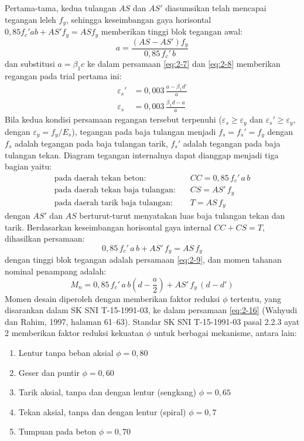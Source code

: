Pertama-tama, kedua tulangan $AS$ dan $AS'$ diasumsikan telah mencapai
tegangan leleh $f_y$, sehingga keseimbangan gaya horisontal
$0{,}85f_c'ab + AS'f_y = AS f_y$ memberikan tinggi blok tegangan awal:
\begin{equation}
a = \frac{(AS-AS')f_y}{0{,}85\,f_c'\,b}
\label{eq:2-9}
\end{equation}
dan substitusi $a=\beta_1 c$ ke dalam persamaan \eqref{eq:2-7} dan
\eqref{eq:2-8} memberikan regangan pada trial pertama ini:
\begin{align}
\varepsilon_s' &= 0{,}003\,\frac{a-\beta_1 d'}{a} \label{eq:2-10}\\
\varepsilon_s &= 0{,}003\,\frac{\beta_1 d - a}{a} \label{eq:2-10b}
\end{align}
Bila kedua kondisi persamaan regangan tersebut terpenuhi ($\varepsilon_s
\ge \varepsilon_y$ dan $\varepsilon_s' \ge \varepsilon_y$, dengan
$\varepsilon_y = f_y/E_s$), tegangan pada baja tulangan menjadi
$f_s = f_s' = f_y$ dengan $f_s$ adalah tegangan pada baja tulangan tarik,
$f_s'$ adalah tegangan pada baja tulangan tekan. Diagram tegangan
internalnya dapat dianggap menjadi tiga bagian yaitu:
\begin{align}
\text{pada daerah tekan beton:} \quad & CC = 0{,}85\,f_c'\,a\,b \label{eq:2-11}\\
\text{pada daerah tekan baja tulangan:} \quad & CS = AS'\,f_y \label{eq:2-12}\\
\text{pada daerah tarik baja tulangan:} \quad & T = AS\,f_y \label{eq:2-13}
\end{align}
dengan $AS'$ dan $AS$ berturut-turut menyatakan luas baja tulangan tekan
dan tarik. Berdasarkan keseimbangan horisontal gaya internal $CC+CS=T$,
dihasilkan persamaan:
\begin{equation}
0{,}85\,f_c'\,a\,b + AS'\,f_y = AS\,f_y
\label{eq:2-14}
\end{equation}
dengan tinggi blok tegangan adalah persamaan \eqref{eq:2-9}, dan momen
tahanan nominal penampang adalah:
\begin{equation}
M_n = 0{,}85\,f_c'\,a\,b\left(d-\frac{a}{2}\right) + AS'\,f_y\,(d-d')
\label{eq:2-16}
\end{equation}
Momen desain diperoleh dengan memberikan faktor reduksi $\phi$ tertentu,
yang disarankan dalam SK SNI T-15-1991-03, ke dalam persamaan
\eqref{eq:2-16} (Wahyudi dan Rahim, 1997, halaman 61--63). Standar SK SNI
T-15-1991-03 pasal 2.2.3 ayat 2 memberikan faktor reduksi kekuatan $\phi$
untuk berbagai mekanisme, antara lain:
\begin{enumerate}[label=\alph*.]
\item Lentur tanpa beban aksial \dotfill $\phi = 0{,}80$
\item Geser dan puntir \dotfill $\phi = 0{,}60$
\item Tarik aksial, tanpa dan dengan lentur (sengkang) \dotfill $\phi = 0{,}65$
\item Tekan aksial, tanpa dan dengan lentur (spiral) \dotfill $\phi = 0{,}7$
\item Tumpuan pada beton \dotfill $\phi = 0{,}70$
\end{enumerate}

